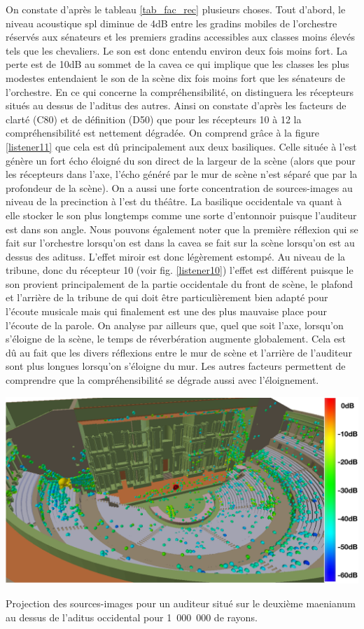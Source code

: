  
On constate d'après le tableau \ref{tab_fac_rec} plusieurs choses. Tout d'abord, le niveau acoustique \gls{spl} diminue de 4dB entre les gradins mobiles de l'orchestre réservés aux sénateurs et les premiers gradins accessibles aux classes moins élevés tels que les chevaliers. Le son est donc entendu environ deux fois moins fort. La perte est de 10dB au sommet de la \gls{cavea} ce qui implique que les classes les plus modestes entendaient le son de la scène dix fois moins fort que les sénateurs de l'orchestre. En ce qui concerne la compréhensibilité, on distinguera les récepteurs situés au dessus de l'\gls{aditus} des autres. Ainsi on constate d'après les facteurs de clarté (\gls{C80}) et de définition (\gls{D50}) que pour les récepteurs 10 à 12 la compréhensibilité est nettement dégradée. On comprend grâce à la figure \ref{listener11} que cela est dû principalement aux deux \glspl{basilique}. Celle située à l'est génère un fort écho éloigné du son direct de la largeur de la scène (alors que pour les récepteurs dans l'axe, l'écho généré par le mur de scène n'est séparé que par la profondeur de la scène). On a aussi une forte concentration de sources-images au niveau de la \gls{precinction} à l'est du théâtre. La basilique occidentale va quant à elle stocker le son plus longtemps comme une sorte d'entonnoir puisque l'auditeur est dans son angle. Nous pouvons également noter que la première réflexion qui se fait sur l'orchestre lorsqu'on est dans la \gls{cavea} se fait sur la scène lorsqu'on est au dessus des \glspl{aditus}. L'effet miroir est donc légèrement estompé. Au niveau de la tribune, donc du récepteur 10 (voir fig. \ref{listener10}) l'effet est différent puisque le son provient principalement de la partie occidentale du front de scène, le plafond et l'arrière de la tribune de qui doit être particulièrement bien adapté pour l'écoute musicale mais qui finalement est une des plus mauvaise place pour l'écoute de la parole.
On analyse par ailleurs que, quel que soit l'axe, lorsqu'on s'éloigne de la scène, le temps de réverbération augmente globalement. Cela est dû au fait que les divers réflexions entre le mur de scène et l'arrière de l'auditeur sont plus longues lorsqu'on s'éloigne du mur. Les autres facteurs permettent de comprendre que la compréhensibilité se dégrade aussi avec l'éloignement. 
\begin{figureth}
	\includegraphics[width=\linewidth]{images/Listener11}
	\caption{Projection des sources-images pour un auditeur situé sur le deuxième \gls{maenianum} au dessus de l'\gls{aditus} occidental pour 1~000~000 de rayons.}
	\label{listener11}
\end{figureth}
